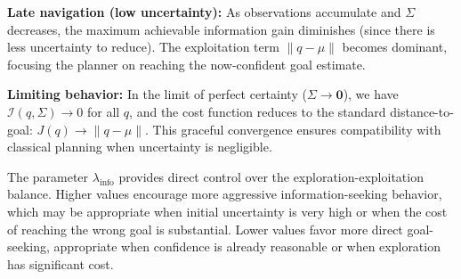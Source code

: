 \textbf{Late navigation (low uncertainty):} As observations accumulate and $\Sigma$ decreases, the maximum achievable information gain diminishes (since there is less uncertainty to reduce). The exploitation term $\|q - \mu\|$ becomes dominant, focusing the planner on reaching the now-confident goal estimate.

\textbf{Limiting behavior:} In the limit of perfect certainty ($\Sigma \to \mathbf{0}$), we have $\mathcal{I}(q, \Sigma) \to 0$ for all $q$, and the cost function reduces to the standard distance-to-goal: $J(q) \to \|q - \mu\|$. This graceful convergence ensures compatibility with classical planning when uncertainty is negligible.

The parameter $\lambda_{\text{info}}$ provides direct control over the exploration-exploitation balance. Higher values encourage more aggressive information-seeking behavior, which may be appropriate when initial uncertainty is very high or when the cost of reaching the wrong goal is substantial. Lower values favor more direct goal-seeking, appropriate when confidence is already reasonable or when exploration has significant cost.

